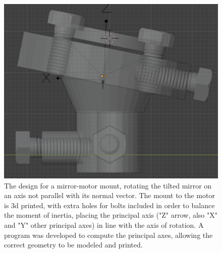 \documentclass[twocolumn]{revtex4-2}
\begin{document}
\begin{figure}
    \centering
    \includegraphics[width=0.95\linewidth]{tilt-mirror-profile.png}
    \caption[Tilted Mirror Mount Blueprint]{The design for a mirror-motor mount, rotating the tilted mirror on an axis not parallel with its normal vector. The mount to the motor is 3d printed, with extra holes for bolts included in order to balance the moment of inertia, placing the principal axis ("Z" arrow, also "X" and "Y" other principal axes) in line with the axis of rotation. A program was developed to compute the principal axes, allowing the correct geometry to be modeled and printed.}
    \label{fig:tilt-mirror-profile}
\end{figure}
\end{document}
